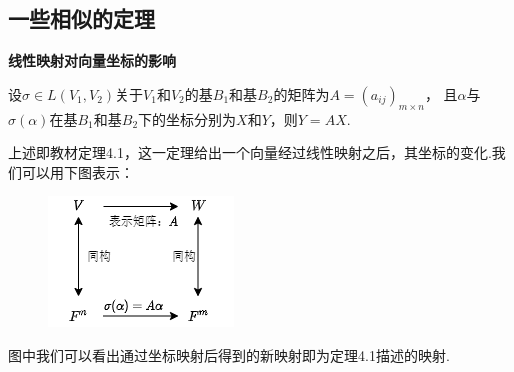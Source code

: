 \subsection{一些相似的定理}
\begin{theorem}
	\textbf{线性映射对向量坐标的影响}
	
	设$\sigma \in L(V_1,V_2)$关于$V_1$和$V_2$的基$B_1$和基$B_2$的矩阵为$A=(a_{ij})_{m \times n}$，
	且$\alpha$与$\sigma(\alpha)$在基$B_1$和基$B_2$下的坐标分别为$X$和$Y$，则$Y=AX$.
\end{theorem}
上述即教材定理4.1，这一定理给出一个向量经过线性映射之后，其坐标的变化.我们可以用下图表示：
\begin{figure}[h]
	\centering
	\includegraphics[scale=0.75]{./figs/6/6-1.png}
\end{figure}

图中我们可以看出通过坐标映射后得到的新映射即为定理4.1描述的映射.

